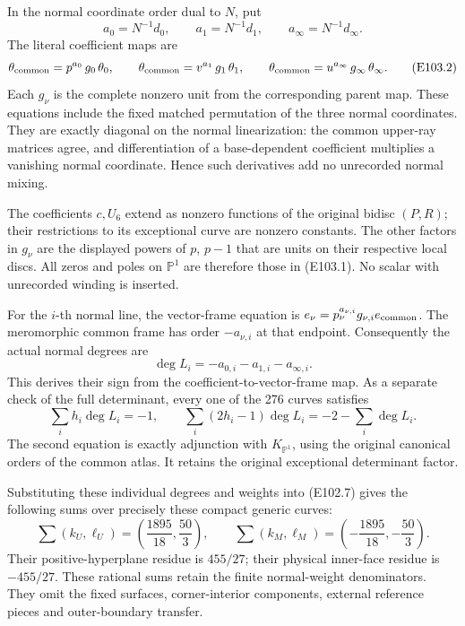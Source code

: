 In the normal coordinate order dual to \(N\), put
\[
 a_0=N^{-1}d_0,\qquad a_1=N^{-1}d_1,\qquad
 a_\infty=N^{-1}d_\infty.
\]
The literal coefficient maps are
\[
 \theta_{\rm common}
   =p^{a_0}\,g_0\,\theta_0,\qquad
 \theta_{\rm common}
   =v^{a_1}\,g_1\,\theta_1,\qquad
 \theta_{\rm common}
   =u^{a_\infty}\,g_\infty\,\theta_\infty.
 \tag{E103.2}
\]
Each \(g_\nu\) is the complete nonzero unit from the corresponding parent map. These equations include the fixed matched permutation of the three normal coordinates. They are exactly diagonal on the normal linearization: the common upper-ray matrices agree, and differentiation of a base-dependent coefficient multiplies a vanishing normal coordinate. Hence such derivatives add no unrecorded normal mixing.

The coefficients \(c,U_6\) extend as nonzero functions of the original bidisc \((P,R)\); their restrictions to its exceptional curve are nonzero constants. The other factors in \(g_\nu\) are the displayed powers of \(p\), \(p-1\) that are units on their respective local discs. All zeros and poles on \(\mathbb P^1\) are therefore those in (E103.1). No scalar with unrecorded winding is inserted.

For the \(i\)-th normal line, the vector-frame equation is
\(e_\nu=p_\nu^{a_{\nu,i}}g_{\nu,i}e_{\rm common}\).
The meromorphic common frame has order \(-a_{\nu,i}\) at that endpoint. Consequently the actual normal degrees are
\[
                         \deg L_i=-a_{0,i}-a_{1,i}-a_{\infty,i}.
 \tag{E103.3}
\]
This derives their sign from the coefficient-to-vector-frame map. As a separate check of the full determinant, every one of the 276 curves satisfies
\[
 \sum_i h_i\deg L_i=-1,\qquad
 \sum_i(2h_i-1)\deg L_i=-2-\sum_i\deg L_i.
 \tag{E103.4}
\]
The second equation is exactly adjunction with \(K_{\mathbb P^1}\), using the original canonical orders of the common atlas. It retains the original exceptional determinant factor.

Substituting these individual degrees and weights into (E102.7) gives the following sums over precisely these compact generic curves:
\[
 \sum(k_U,\ell_U)=\left(\frac{1895}{18},\frac{50}{3}\right),
 \qquad
 \sum(k_M,\ell_M)=\left(-\frac{1895}{18},-\frac{50}{3}\right).
 \tag{E103.5}
\]
Their positive-hyperplane residue is \(455/27\); their physical inner-face residue is \(-455/27\). These rational sums retain the finite normal-weight denominators. They omit the fixed surfaces, corner-interior components, external reference pieces and outer-boundary transfer.

